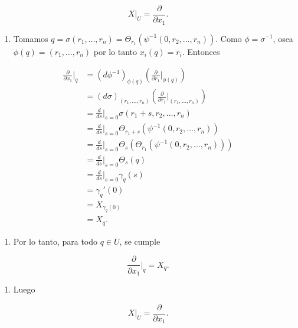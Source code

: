 \begin{bookproof}{}
\[
X|_U=\frac{\partial}{\partial x_1}.
\]
\begin{enumerate}[start=12]
\item Tomamos $q=\sigma(r_1,\ldots,r_n)=\Theta_{r_1}\left(\psi^{-1}(0,r_2,\ldots,r_n)\right).$ Como $\phi=\sigma^{-1}$, osea $\phi(q)=(r_{1},\ldots,r_{n})$ por lo tanto $x_{i}(q)=r_{i}$. Entonces
\end{enumerate}
\[
\begin{aligned}\frac{\partial}{\partial x_1}\bigg|_q&=(d\phi ^{-1})_{\phi(q)}\left(\frac{\partial}{\partial r_{1}}\bigg|_{\phi(q)}\right)\\&=(d\sigma)_{(r_1,\ldots,r_n)}\left(\frac{\partial}{\partial r_1}\bigg|_{(r_1,\ldots,r_n)}\right)\\&=\frac{d}{ds}\bigg|_{s=0}\sigma(r_1+s,r_2,\ldots,r_n)\\&=\frac{d}{ds}\bigg|_{s=0}\Theta_{r_1+s}\left(\psi^{-1}(0,r_2,\ldots,r_n)\right)\\&=\frac{d}{ds}\bigg|_{s=0}\Theta_s\left(\Theta_{r_1}\left(\psi^{-1}(0,r_2,\ldots,r_n)\right)\right)\\&=\frac{d}{ds}\bigg|_{s=0}\Theta_s(q)\\&=\frac{d}{ds}\bigg|_{s=0}\gamma_q(s)\\&=\gamma_q'(0)\\&=X_{\gamma_q(0)}\\&=X_q.\end{aligned}
\]
\begin{enumerate}[start=13]
\item Por lo tanto, para todo $q\in U$, se cumple
\end{enumerate}
\[
\frac{\partial}{\partial x_1}\bigg|_q=X_q.
\]
\begin{enumerate}[start=14]
\item Luego
\end{enumerate}
\[
X|_U=\frac{\partial}{\partial x_1}.
\]
\bookqed
\end{bookproof}
